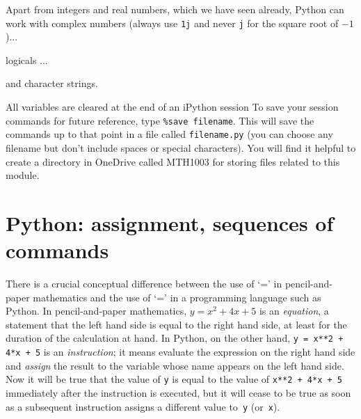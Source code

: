 


\vspace{18mm}
Apart from integers and real numbers, which we have seen already, Python can work with
complex numbers (always use {\tt 1j} and never {\tt j} for the square root of $-1$)...


\vspace{10mm}
\noindent
logicals ...


\vspace{10mm}
\noindent
and character strings.


\vspace{10mm}
All variables are cleared at the end of an iPython session To save
your session commands for future reference, type \texttt{\%save
  filename}. This will save the commands up to that point in a file
called \texttt{filename.py} (you can choose any filename but don't
include spaces or special characters). You will find it helpful to
create a directory in OneDrive called MTH1003 for storing files
related to this module.

\section{Python: assignment, sequences of commands}

There is a crucial conceptual difference between the use of `=' in pencil-and-paper
mathematics and the use of `=' in a programming language such as Python. In
pencil-and-paper mathematics, $y = x^2 +4x + 5$ is an \textit{equation}, a statement
that the left hand side is equal to the right hand side, at least for the duration of
the calculation at hand. In Python, on the other hand, \texttt{y = x**2 + 4*x + 5}
is an \textit{instruction}; it means evaluate the expression on the right hand side
and \textit{assign} the result to the variable whose name appears on the left hand side.
Now it will be true that the value of \texttt{y} is equal to the value of 
\texttt{x**2 + 4*x + 5} immediately after the instruction is executed, but it will cease
to be true as soon as a subsequent instruction assigns a different value to~\texttt{y}
(or~\texttt{x}).

